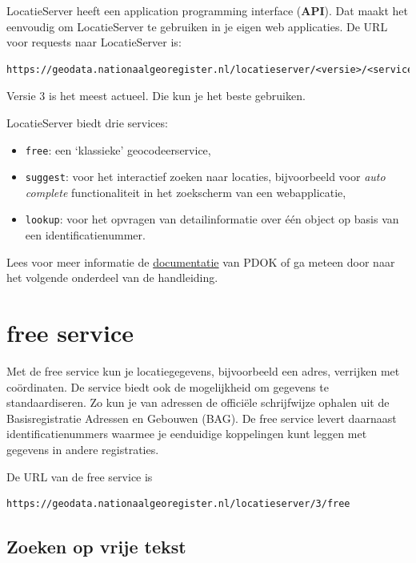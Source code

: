 \documentclass[]{book}
\providecommand{\tightlist}{%
  \setlength{\itemsep}{0pt}\setlength{\parskip}{0pt}}
\begin{document}
LocatieServer heeft een application programming interface (\textbf{API}). Dat maakt het eenvoudig om LocatieServer te gebruiken in je eigen web applicaties. De URL voor requests naar LocatieServer is:

\begin{verbatim}
https://geodata.nationaalgeoregister.nl/locatieserver/<versie>/<service>
\end{verbatim}

Versie 3 is het meest actueel. Die kun je het beste gebruiken.

LocatieServer biedt drie services:

\begin{itemize}
\tightlist
\item
  \texttt{free}: een `klassieke' geocodeerservice,\\
\item
  \texttt{suggest}: voor het interactief zoeken naar locaties, bijvoorbeeld voor \emph{auto complete} functionaliteit in het zoekscherm van een webapplicatie,\\
\item
  \texttt{lookup}: voor het opvragen van detailinformatie over één object op basis van een identificatienummer.
\end{itemize}

Lees voor meer informatie de \protect\hyperlink{documentatie}{documentatie} van PDOK of ga meteen door naar het volgende onderdeel van de handleiding.

\hypertarget{free}{%
\chapter{free service}\label{free}}

Met de free service kun je locatiegegevens, bijvoorbeeld een adres, verrijken met coördinaten. De service biedt ook de mogelijkheid om gegevens te standaardiseren. Zo kun je van adressen de officiële schrijfwijze ophalen uit de Basisregistratie Adressen en Gebouwen (BAG). De free service levert daarnaast identificatienummers waarmee je eenduidige koppelingen kunt leggen met gegevens in andere registraties.

De URL van de free service is

\begin{verbatim}
https://geodata.nationaalgeoregister.nl/locatieserver/3/free
\end{verbatim}

\hypertarget{zoeken-op-vrije-tekst}{%
\section{Zoeken op vrije tekst}\label{zoeken-op-vrije-tekst}}
\end{document}
